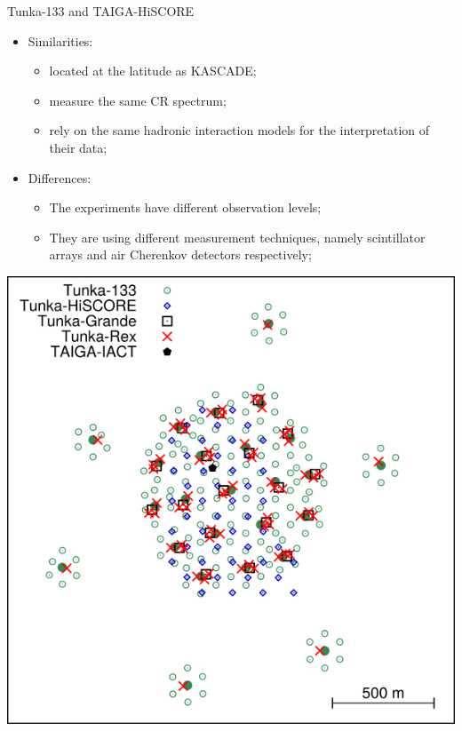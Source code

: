 
%

\begin{frame}{Tunka-133 and TAIGA-HiSCORE}
\begin{minipage}[c]{0.6\textwidth}
\begin{itemize}
  \item Similarities:
  \begin{itemize}
    \item located at the latitude as KASCADE;
    \item measure the same CR spectrum;
    \item rely on the same hadronic interaction models for the interpretation of their data;
  \end{itemize}
  \item Differences:
  \begin{itemize}
    \item The experiments have different observation levels;
    \item They are using different measurement techniques, namely scintillator arrays and air Cherenkov detectors respectively;
  \end{itemize}
\end{itemize}
\end{minipage}
\hfill
\begin{minipage}[c]{0.39\textwidth}
\includegraphics[width=1\textwidth]{pics/taiga_map.png}
\end{minipage}


\end{frame}
